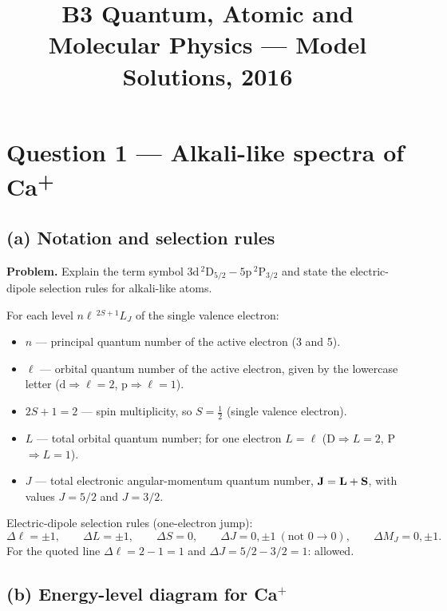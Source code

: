 \documentclass[11pt]{article}
\title{B3 Quantum, Atomic and Molecular Physics --- Model Solutions, 2016}
\author{}
\date{}
\begin{document}
\maketitle

\section*{Question 1 --- Alkali-like spectra of Ca\textsuperscript{+}}

\subsection*{(a) Notation and selection rules}

\textbf{Problem.} Explain the term symbol $3\mathrm{d}\,{}^{2}\!\mathrm{D}_{5/2}-5\mathrm{p}\,{}^{2}\!\mathrm{P}_{3/2}$ and state the electric-dipole selection rules for alkali-like atoms.

For each level $n\ell\,{}^{2S+1}L_{J}$ of the single valence electron:
\begin{itemize}\itemsep0pt
\item $n$ --- principal quantum number of the active electron (3 and 5).
\item $\ell$ --- orbital quantum number of the active electron, given by the lowercase letter ($\mathrm{d}\Rightarrow\ell=2$, $\mathrm{p}\Rightarrow\ell=1$).
\item $2S+1=2$ --- spin multiplicity, so $S=\tfrac{1}{2}$ (single valence electron).
\item $L$ --- total orbital quantum number; for one electron $L=\ell$ (D$\Rightarrow L=2$, P$\Rightarrow L=1$).
\item $J$ --- total electronic angular-momentum quantum number, $\vb J=\vb L+\vb S$, with values $J=5/2$ and $J=3/2$.
\end{itemize}

Electric-dipole selection rules (one-electron jump):
\[
\Delta\ell=\pm 1,\qquad \Delta L=\pm 1,\qquad \Delta S=0,\qquad \Delta J=0,\pm 1\ (\text{not }0\to0),\qquad \Delta M_{J}=0,\pm 1.
\]
For the quoted line $\Delta\ell=2-1=1$ and $\Delta J=5/2-3/2=1$: allowed.

\subsection*{(b) Energy-level diagram for Ca\texorpdfstring{$^{+}$}{+}}
\end{document}
